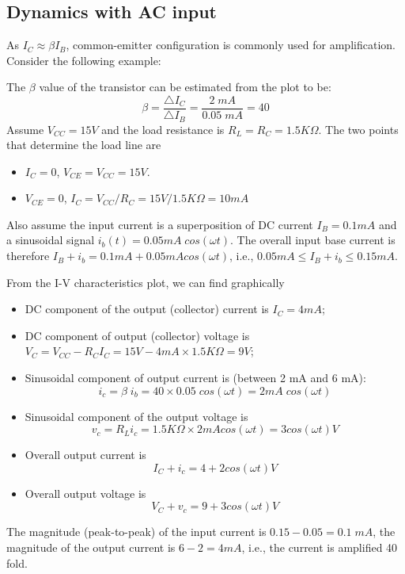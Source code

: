 \begin{itemize}
\subsection*{Dynamics with AC input}

As $I_C\approx \beta I_B$, common-emitter configuration is commonly used for
amplification. Consider the following example:


The $\beta$ value of the transistor can be estimated from the plot to be:
\[ \beta=\frac{\triangle I_C}{\triangle I_B}=\frac{2\;mA}{0.05\;mA}=40 \]
Assume $V_{CC}=15V$ and the load resistance is $R_L=R_C=1.5K\Omega$. The 
two points that determine the load line are
\begin{itemize}
\item $I_C=0$, $V_{CE}=V_{CC}=15V$. 
\item $V_{CE}=0$, $I_C=V_{CC}/R_C=15V/1.5K\Omega=10 mA$
\end{itemize}
Also assume the input current is a superposition of DC current $I_B=0.1mA$ 
and a sinusoidal signal $i_b(t)=0.05mA\;cos(\omega t)$. The overall input
base current is therefore $I_B+i_b=0.1mA+0.05mA cos(\omega t)$, i.e.,
$0.05 mA \le I_B+i_b \le 0.15 mA$. 

From the I-V characteristics plot, we can find graphically 
\begin{itemize}
\item DC component of the output (collector) current is $I_C=4 mA$; 
\item DC component of output (collector) voltage is 
	$V_C=V_{CC}-R_C I_C=15V-4 mA \times 1.5 K\Omega=9V$;
\item Sinusoidal component of output current is (between 2 mA and 6 mA):
  \[ i_c=\beta\;i_b=40\times 0.05\;cos(\omega t)=2mA\;cos(\omega t) \]
\item Sinusoidal component of the output voltage is 
  \[ v_c=R_L i_c=1.5 K\Omega \times 2mA cos(\omega t)=3 cos(\omega t) V \]
\item Overall output current is 
  \[I_C+i_c=4+2 cos(\omega t) V \] 
\item Overall output voltage is 
  \[ V_C+v_c=9+3 cos(\omega t) V \]
\end{itemize}
The magnitude (peak-to-peak) of the input current is $0.15-0.05=0.1\;mA$, 
the magnitude of the output current is $6-2=4mA$, i.e., the current is
amplified 40 fold.

\end{itemize}

